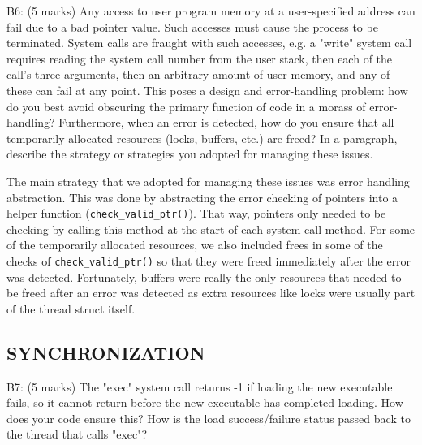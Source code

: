 
\noindent B6: (5 marks)
Any access to user program memory at a user-specified address
can fail due to a bad pointer value.  Such accesses must cause the process to be terminated. System calls are fraught with such
accesses, e.g. a "write" system call requires reading the system
call number from the user stack, then each of the call's three
arguments, then an arbitrary amount of user memory, and any of
these can fail at any point.  This poses a design and
error-handling problem: how do you best avoid obscuring the primary
function of code in a morass of error-handling?  Furthermore, when
an error is detected, how do you ensure that all temporarily
allocated resources (locks, buffers, etc.) are freed?  In a
paragraph, describe the strategy or strategies you adopted for
managing these issues.


The main strategy that we adopted for managing these issues was error handling abstraction. This was done by abstracting the error checking of pointers into a helper function (\texttt{check\_valid\_ptr()}). That way, pointers only needed to be checking by calling this method at the start of each system call method. For some of the temporarily allocated resources, we also included frees in some of the checks of \texttt{check\_valid\_ptr()} so that they were freed immediately after the error was detected. Fortunately, buffers were really the only resources that needed to be freed after an error was detected as extra resources like locks were usually part of the thread struct itself.



\subsection*{SYNCHRONIZATION}

\noindent B7: (5 marks)
The "exec" system call returns -1 if loading the new executable
fails, so it cannot return before the new executable has completed
loading.  How does your code ensure this?  How is the load
success/failure status passed back to the thread that calls "exec"?

